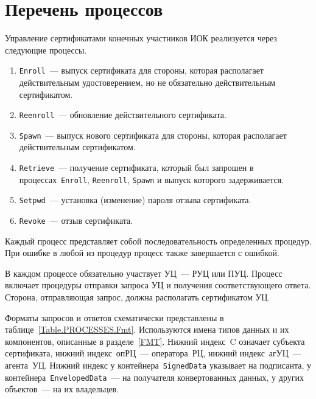 \section{Перечень процессов}\label{PROCESSES.List}

Управление сертификатами конечных участников ИОК реализуется через 
следующие процессы. 

\begin{enumerate}
\item
\texttt{Enroll}~--- 
выпуск сертификата для стороны, которая располагает действительным
удостоверением, но не обязательно действительным сертификатом.
\item
\texttt{Reenroll}~--- 
обновление действительного сертификата.
\item
\texttt{Spawn}~--- 
выпуск нового сертификата для стороны, которая располагает действительным
сертификатом.
\item
\texttt{Retrieve}~--- 
получение сертификата, который был запрошен в процессах~\texttt{Enroll},
\texttt{Reenroll}, \texttt{Spawn} и выпуск которого задерживается.
\item
\texttt{Setpwd}~--- 
установка (изменение) пароля отзыва сертификата.
\item
\texttt{Revoke}~--- 
отзыв сертификата.
\end{enumerate}

Каждый процесс представляет собой последовательность определенных процедур. 
При ошибке в любой из процедур процесс также завершается с ошибкой.

В каждом процессе обязательно участвует УЦ~--- РУЦ или ПУЦ.
Процесс включает процедуры отправки запроса УЦ и получения 
соответствующего ответа. Сторона, отправляющая запрос, должна располагать 
сертификатом УЦ.

Форматы запросов и ответов схематически представлены 
в таблице~\ref{Table.PROCESSES.Fmt}. Используются имена типов данных и их 
компонентов, описанные в разделе~\ref{FMT}. Нижний индекс~C означает 
субъекта сертификата, нижний индекс~опРЦ~--- оператора~РЦ,
нижний индекс~агУЦ~--- агента~УЦ.
%
Нижний индекс у контейнера~\texttt{SignedData} указывает на подписанта,
у контейнера~\texttt{EnvelopedData}~--- на получателя конвертованных данных,
у других объектов~--- на их владельцев.

